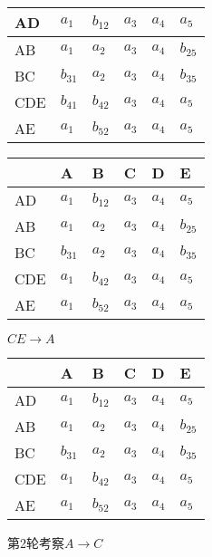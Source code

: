 \documentclass[10pt, a4paper]{article}
\begin{document}
\begin{enumerate}
\begin{enumerate}
\begin{figure}[H]
\begin{minipage}[b]{0.5\linewidth}
\begin{tabular}{|l|l|l|l|l|l|}
						AD  & $a_1$ & $b_{12}$ & $a_3$  & $a_4$  & $a_5$  \\ \hline
						AB  & $a_1$ & $a_2$  & $a_3$  & $a_4$ & $b_{25}$  \\ \hline
						BC  & $b_{31}$ &  $a_2$ & $a_3$ & $a_4$ & $b_{35}$ \\ \hline
						CDE & $b_{41}$ & $b_{42}$ & $a_3$ & $a_4$ & $a_5$ \\ \hline
						AE  & $a_1$ & $b_{52}$ & $a_3$ & $a_4$ & $a_5$ \\ \hline
						\end{tabular}
						\caption{$DE\to C$}\label{tab:5}
				\end{minipage}
				\begin{minipage}[b]{0.5\linewidth}
					\centering
					\begin{tabular}{|l|l|l|l|l|l|}
						\hline
							& A & B & C & D & E \\ \hline
						AD  & $a_1$ & $b_{12}$ & $a_3$  & $a_4$  & $a_5$  \\ \hline
						AB  & $a_1$ & $a_2$  & $a_3$  & $a_4$ & $b_{25}$  \\ \hline
						BC  & $b_{31}$ &  $a_2$ & $a_3$ & $a_4$ & $b_{35}$ \\ \hline
						CDE & $a_1$ & $b_{42}$ & $a_3$ & $a_4$ & $a_5$ \\ \hline
						AE  & $a_1$ & $b_{52}$ & $a_3$ & $a_4$ & $a_5$ \\ \hline
						\end{tabular}
						\caption{$CE\to A$}\label{tab:6}
				\end{minipage}
			\end{figure}
			\begin{figure}[H]
				\begin{minipage}[b]{0.5\linewidth}
					\centering
					\begin{tabular}{|l|l|l|l|l|l|}
						\hline
							& A & B & C & D & E \\ \hline
						AD  & $a_1$ & $b_{12}$ & $a_3$  & $a_4$  & $a_5$  \\ \hline
						AB  & $a_1$ & $a_2$  & $a_3$  & $a_4$ & $b_{25}$  \\ \hline
						BC  & $b_{31}$ &  $a_2$ & $a_3$ & $a_4$ & $b_{35}$ \\ \hline
						CDE & $a_1$ & $b_{42}$ & $a_3$ & $a_4$ & $a_5$ \\ \hline
						AE  & $a_1$ & $b_{52}$ & $a_3$ & $a_4$ & $a_5$ \\ \hline
						\end{tabular}
						\caption{第2轮考察$A\to C$}\label{tab:7}

\end{minipage}
\end{figure}
\end{enumerate}
\end{enumerate}
\end{document}
